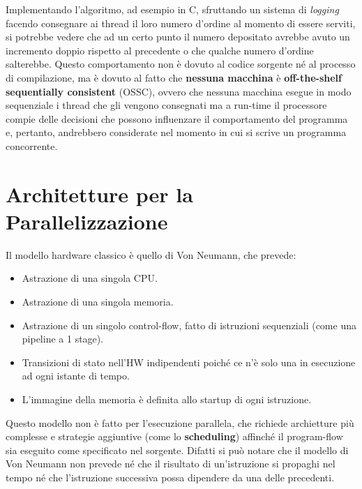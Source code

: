 Implementando l'algoritmo, ad esempio in C, sfruttando un sistema di \textit{logging} facendo consegnare ai thread il loro numero d'ordine al momento di essere serviti, si potrebbe vedere che ad un certo punto il numero depositato avrebbe avuto un incremento doppio rispetto al precedente o che qualche numero d'ordine salterebbe.
Questo comportamento non è dovuto al codice sorgente né al processo di compilazione, ma è dovuto al fatto che \textbf{nessuna macchina} è \textbf{off-the-shelf sequentially consistent} (OSSC), ovvero che nessuna macchina esegue in modo sequenziale i thread che gli vengono consegnati ma a run-time il processore compie delle decisioni che possono influenzare il comportamento del programma e, pertanto, andrebbero considerate nel momento in cui si scrive un programma concorrente.

\section{Architetture per la Parallelizzazione}\label{sec:parrallel-arch}
Il modello hardware classico è quello di Von Neumann, che prevede:
\begin{itemize}
    \item Astrazione di una singola CPU.
    \item Astrazione di una singola memoria.
    \item Astrazione di un singolo control-flow, fatto di istruzioni sequenziali (come una pipeline a 1 stage).
    \item Transizioni di stato nell'HW indipendenti poiché ce n'è solo una in esecuzione ad ogni istante di tempo. 
    \item L'immagine della memoria è definita allo startup di ogni istruzione.
\end{itemize}
Questo modello non è fatto per l'esecuzione parallela, che richiede archietture più complesse e strategie aggiuntive (come lo \textbf{scheduling}) affinché il program-flow sia eseguito come specificato nel sorgente. Difatti si può notare che il modello di Von Neumann non prevede né che il risultato di un'istruzione si propaghi nel tempo né che l'istruzione successiva possa dipendere da una delle precedenti.

